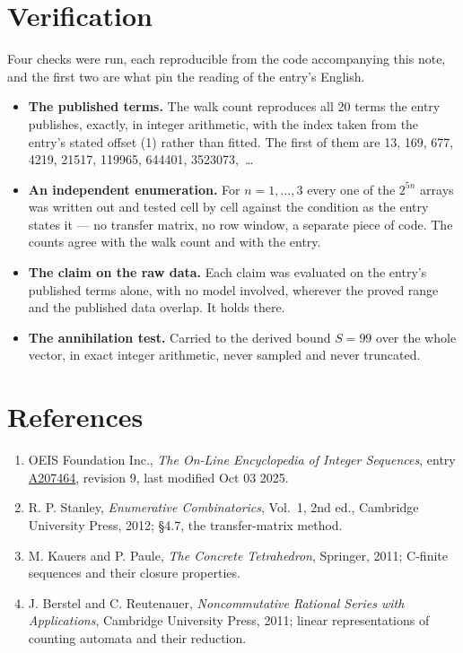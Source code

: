 \documentclass[11pt]{article}
\theoremstyle{definition}
\begin{document}
\section{Verification}

Four checks were run, each reproducible from the code accompanying this note, and the first two are what pin the reading of the entry's English.

\begin{itemize}

\item {\bfseries The published terms.} The walk count reproduces all 20 terms the entry publishes, exactly, in integer arithmetic, with the index taken from the entry's stated offset (1) rather than fitted. The first of them are 13, 169, 677, 4219, 21517, 119965, 644401, 3523073,~\dots

\item {\bfseries An independent enumeration.} For $n = 1,\dots,3$ every one of the $2^{5n}$ arrays was written out and tested cell by cell against the condition as the entry states it --- no transfer matrix, no row window, a separate piece of code. The counts agree with the walk count and with the entry.

\item {\bfseries The claim on the raw data.} Each claim was evaluated on the entry's published terms alone, with no model involved, wherever the proved range and the published data overlap. It holds there.

\item {\bfseries The annihilation test.} Carried to the derived bound $S = 99$ over the whole vector, in exact integer arithmetic, never sampled and never truncated.

\end{itemize}

\section{References}

\begin{enumerate}

\item OEIS Foundation Inc., \emph{The On-Line Encyclopedia of Integer Sequences}, entry \href{https://oeis.org/A207464}{A207464}, revision 9, last modified Oct 03 2025.

\item R. P. Stanley, \emph{Enumerative Combinatorics}, Vol.~1, 2nd ed., Cambridge University Press, 2012; \S4.7, the transfer-matrix method.

\item M. Kauers and P. Paule, \emph{The Concrete Tetrahedron}, Springer, 2011; C-finite sequences and their closure properties.

\item J. Berstel and C. Reutenauer, \emph{Noncommutative Rational Series with Applications}, Cambridge University Press, 2011; linear representations of counting automata and their reduction.

\end{enumerate}
\end{document}
